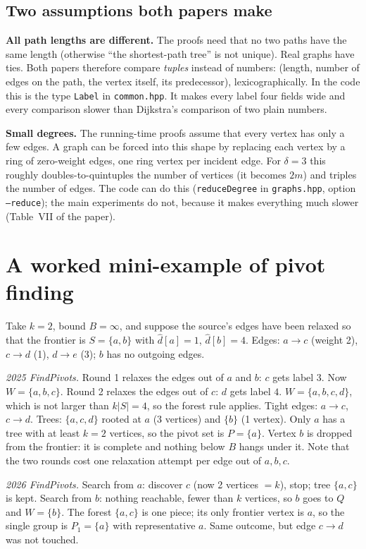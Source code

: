 \documentclass[11pt,a4paper]{article}
\newcommand{\dhat}{\widehat{d}}
\newcommand{\code}[1]{\texttt{#1}}
\begin{document}
\subsection{Two assumptions both papers make}
\textbf{All path lengths are different.} The proofs need that no two paths have the same length (otherwise ``the shortest-path tree'' is not unique). Real graphs have ties. Both papers therefore compare \emph{tuples} instead of numbers: (length, number of edges on the path, the vertex itself, its predecessor), lexicographically. In the code this is the type \code{Label} in \code{common.hpp}. It makes every label four fields wide and every comparison slower than Dijkstra's comparison of two plain numbers.

\textbf{Small degrees.} The running-time proofs assume that every vertex has only a few edges. A graph can be forced into this shape by replacing each vertex by a ring of zero-weight edges, one ring vertex per incident edge. For $\delta=3$ this roughly doubles-to-quintuples the number of vertices (it becomes $2m$) and triples the number of edges. The code can do this (\code{reduceDegree} in \code{graphs.hpp}, option \code{--reduce}); the main experiments do not, because it makes everything much slower (Table~VII of the paper).

\section{A worked mini-example of pivot finding}
Take $k=2$, bound $B=\infty$, and suppose the source's edges have been relaxed so that the frontier is $S=\{a,b\}$ with $\dhat[a]=1$, $\dhat[b]=4$. Edges: $a\to c$ (weight 2), $c\to d$ (1), $d\to e$ (3); $b$ has no outgoing edges.

\emph{2025 FindPivots.} Round 1 relaxes the edges out of $a$ and $b$: $c$ gets label $3$. Now $W=\{a,b,c\}$. Round 2 relaxes the edges out of $c$: $d$ gets label $4$. $W=\{a,b,c,d\}$, which is not larger than $k|S|=4$, so the forest rule applies. Tight edges: $a\to c$, $c\to d$. Trees: $\{a,c,d\}$ rooted at $a$ (3 vertices) and $\{b\}$ (1 vertex). Only $a$ has a tree with at least $k=2$ vertices, so the pivot set is $P=\{a\}$. Vertex $b$ is dropped from the frontier: it is complete and nothing below $B$ hangs under it. Note that the two rounds cost one relaxation attempt per edge out of $a,b,c$.

\emph{2026 FindPivots.} Search from $a$: discover $c$ (now 2 vertices $=k$), stop; tree $\{a,c\}$ is kept. Search from $b$: nothing reachable, fewer than $k$ vertices, so $b$ goes to $Q$ and $W=\{b\}$. The forest $\{a,c\}$ is one piece; its only frontier vertex is $a$, so the single group is $P_1=\{a\}$ with representative $a$. Same outcome, but edge $c\to d$ was not touched.
\end{document}
